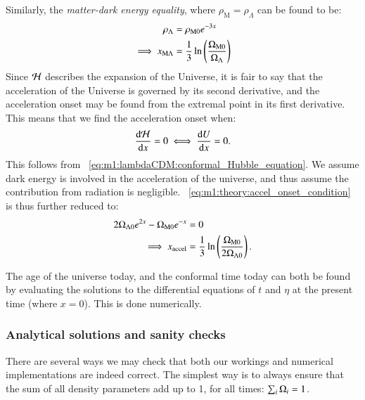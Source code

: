      Similarly, the \textit{matter-dark energy equality}, where $\rho_\mathrm{M}=\rho_\Lambda$ can be found to be:
     \begin{equation}\label{eq:m1:theory:equalities:matter_dark_energy}
        \begin{split}
            \rho_\Lambda &= \rho_\mathrm{M0}e^{-3x} \\
            \implies x_{\mathrm{M}\Lambda} &= \frac{1}{3}\ln\left(\frac{\Omega_\mathrm{M0}}{\Omega_\Lambda}\right)
        \end{split}
     \end{equation}
     Since $\mathcal{H}$ describes the expansion of the Universe, it is fair to say that the acceleration of the Universe is governed by its second derivative, and the acceleration onset may be found from the extremal point in its first derivative. This means that we find the acceleration onset when:
     \begin{equation}\label{eq:m1:theory:accel_onset_condition}
        \dv{\mathcal{H}}{x} = 0 \iff \dv{U}{x} = 0.
     \end{equation}
     This follows from ~\cref{eq:m1:lambdaCDM:conformal_Hubble_equation}. We assume dark energy is involved in the acceleration of the universe, and thus assume the contribution from radiation is negligible. ~\cref{eq:m1:theory:accel_onset_condition} is thus further reduced to:
     \begin{equation}\label{eq:m1:theory:accel_onset_definiton}
        \begin{split}
            2\Omega_{\Lambda0}e^{2x} - \Omega_\mathrm{M0}e^{-x}&=0\\
            \implies x_\mathrm{accel}&=\frac{1}{3}\ln\left(\frac{\Omega_\mathrm{M0}}{2\Omega_{\Lambda0}}\right).
        \end{split}
     \end{equation}
    
    The age of the universe today, and the conformal time today can both be found by evaluating the solutions to the differential equations of $t$ and $\eta$ at the present time (where $x=0$). This is done numerically. 

\subsubsection{Analytical solutions and sanity checks}\label{sec:m1:theory:sanity}
    There are several ways we may check that both our workings and numerical implementations are indeed correct. The simplest way is to always ensure that the sum of all density parameters add up to 1, for all times: $\sum_i\Omega_i=1$. 
    
